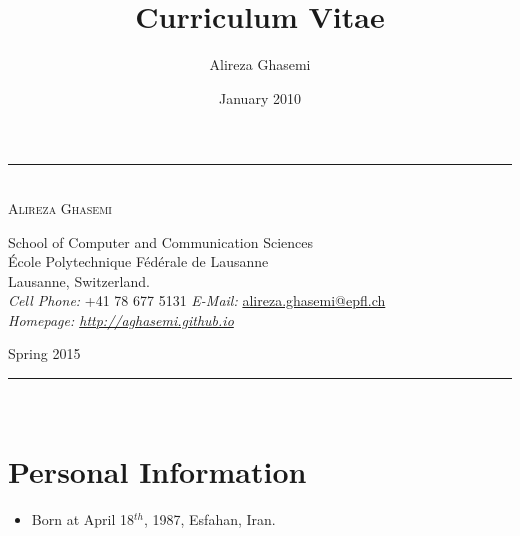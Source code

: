 \documentclass[a4paper]{article}
\title{Curriculum Vitae}
\date{January 2010}
\author{Alireza Ghasemi}
\newcounter{prob_num}
\newcommand{\HRule}{\rule{\linewidth}{0.5mm}}
\theoremstyle{definition}
\begin{document}
\begin{center}
\HRule \\[0.2cm]

{ \Huge{{\textsc{Alireza Ghasemi}}}}\\[0.2cm]

\begin{center} 
{\small School of Computer and Communication Sciences\\
\'{E}cole Polytechnique F\'{e}d\'{e}rale de Lausanne\\
Lausanne, Switzerland.\\[0.2cm]

\emph{Cell Phone:} +41 78 677 5131 \hfill
\emph{E-Mail:} \href{mailto:alireza.ghasemi@epfl.ch}{alireza.ghasemi@epfl.ch}\\
\emph{Homepage: \url{http://aghasemi.github.io}} }

\end{center}
{\large Spring 2015 }\\[0.2cm]
\HRule \\[0.2cm]

\end{center}

\setcounter{prob_num}{1}
\newcommand{\hlmar}[1]{\it{#1}\marginpar{#1}}
\section{Personal Information}
\begin{itemize}
\item Born at April 18$^{th}$, 1987, Esfahan, Iran.\\
\end{itemize}
\end{document}
